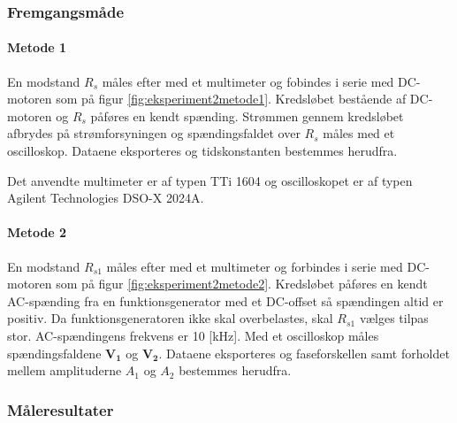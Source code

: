 \subsubsection{Fremgangsmåde}
\paragraph{Metode 1}
En modstand \(R_s\) måles efter med et multimeter og fobindes i serie med DC-motoren
som på figur \ref{fig:eksperiment2metode1}.
Kredsløbet bestående af DC-motoren og \(R_s\) påføres en kendt spænding.
Strømmen gennem kredsløbet afbrydes på strømforsyningen og spændingsfaldet
over \(R_s\) måles med et oscilloskop.
Dataene eksporteres og tidskonstanten bestemmes herudfra.

Det anvendte multimeter er af typen TTi 1604 og oscilloskopet er af typen Agilent Technologies DSO-X 2024A.

\paragraph{Metode 2}
En modstand \(R_{s1}\) måles efter med et multimeter og forbindes i serie med DC-motoren
som på figur \ref{fig:eksperiment2metode2}.
Kredsløbet påføres en kendt AC-spænding fra en funktionsgenerator med et DC-offset så spændingen
altid er positiv.
Da funktionsgeneratoren ikke skal overbelastes, skal \(R_{s1}\) vælges tilpas stor.
AC-spændingens frekvens er 10 [kHz].
Med et oscilloskop måles spændingsfaldene \(\mathbf{V_1}\) og \(\mathbf{V_2}\).
Dataene eksporteres og faseforskellen samt forholdet mellem amplituderne \(A_1\) og \(A_2\) bestemmes herudfra.
\subsubsection{Måleresultater}
